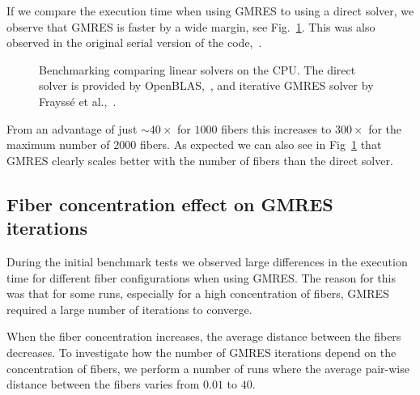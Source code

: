 If we compare the execution time when using GMRES to using a direct solver, we observe that GMRES is faster by a wide margin, see Fig.~\ref{fig:bench_openmp_solvers}. This was also observed in the original serial version of the code,~\cite{Tornberg2006}.

\begin{figure}[!htbp]
  \centering
  \caption[Benchmark linear solvers on CPU.]{Benchmarking comparing linear solvers on the CPU. The direct solver is provided by OpenBLAS,~\cite{OpenBLAS}, and iterative GMRES solver by Frayssé et al.,~\cite{Fraysse2003}.}
  \label{fig:bench_openmp_solvers}
\end{figure}

From an advantage of just ${\sim}40×$ for $1000$ fibers this increases to $300×$ for the maximum number of $2000$ fibers. As expected we can also see in Fig~\ref{fig:bench_openmp_solvers} that GMRES clearly scales better with the number of fibers than the direct solver.

\subsection{Fiber concentration effect on GMRES iterations}
\label{subsec:example_concentration_gmres}

During the initial benchmark tests we observed large differences in the execution time for different fiber configurations when using GMRES. The reason for this was that for some runs, especially for a high concentration of fibers, GMRES required a large number of iterations to converge.

When the fiber concentration increases, the average distance between the fibers decreases. To investigate how the number of GMRES iterations depend on the concentration of fibers, we perform a number of runs where the average pair-wise distance between the fibers varies from $0.01$ to $40$.

